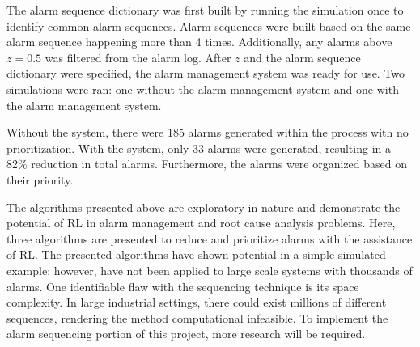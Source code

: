 The alarm sequence dictionary was first built by running the simulation once to identify common alarm sequences.  Alarm sequences were built based on the same alarm sequence happening more than 4 times.  Additionally, any alarms above $z = 0.5$ was filtered from the alarm log.  After $z$ and the alarm sequence dictionary were specified, the alarm management system was ready for use.  Two simulations were ran: one without the alarm management system and one with the alarm management system.

Without the system, there were 185 alarms generated within the process with no prioritization.  With the system, only 33 alarms were generated, resulting in a 82\% reduction in total alarms. Furthermore, the alarms were organized based on their priority.

The algorithms presented above are exploratory in nature and demonstrate the potential of RL in alarm management and root cause analysis problems. Here, three algorithms are presented to reduce and prioritize alarms with the assistance of RL. The presented algorithms have shown potential in a simple simulated example; however, have not been applied to large scale systems with thousands of alarms. One identifiable flaw with the sequencing technique is its space complexity.  In large industrial settings, there could exist millions of different sequences, rendering the method computational infeasible. To implement the alarm sequencing portion of this project, more research will be required.

